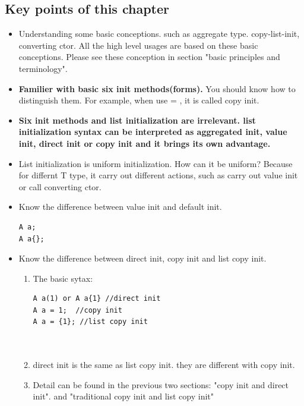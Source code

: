 \documentclass[a4paper,11pt,twoside]{book}
\begin{document}
\subsection{Key points of this chapter}
\begin{itemize}
	
	\item Understanding some basic conceptions. such as aggregate type. copy-list-init, converting ctor. All the high level usages are based on these basic conceptions. Please see these conception in section "basic principles and terminology".
		  
				
	
	\item \textbf{Familier with basic six init methods(forms).} You should know how to distinguish them. For example, when use = , it is called copy init. 
	
	\item \textbf{Six init methods and list initialization are irrelevant. list initialization syntax can be interpreted as aggregated init, value init, direct init or copy init and it brings its own advantage.} 
	
	\item List initialization is uniform initialization. How can it be uniform? Because for differnt T type, it carry out different actions, such as carry out value init or call converting ctor.

	\item Know the difference between value init and default init. 
\begin{lstlisting}
A a;
A a{};
\end{lstlisting}	 

	\item Know the difference between direct init, copy init and list copy init. 
	\begin{enumerate}
		\item The basic sytax:
\begin{lstlisting}
A a(1) or A a{1} //direct init
A a = 1;  //copy init
A a = {1}; //list copy init	
		  
			
\end{lstlisting}	 
		\item direct init is the same as list copy init. they are different with copy init.
		\item Detail can be found in the previous two sections: "copy init and direct init". and "traditional copy init and list copy init"
		
	\end{enumerate}
  

\end{itemize}
\end{document}
